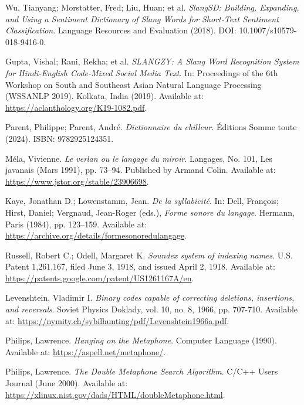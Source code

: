 \documentclass[12pt]{article}
\begin{document}
\begin{thebibliography}{9}
Wu, Tianyang; Morstatter, Fred; Liu, Huan; et al.  
\textit{SlangSD: Building, Expanding, and Using a Sentiment Dictionary of Slang Words for Short-Text Sentiment Classification}.  
Language Resources and Evaluation (2018).  
DOI: 10.1007/s10579-018-9416-0.  

Gupta, Vishal; Rani, Rekha; et al.  
\textit{SLANGZY: A Slang Word Recognition System for Hindi-English Code-Mixed Social Media Text}.  
In: Proceedings of the 6th Workshop on South and Southeast Asian Natural Language Processing (WSSANLP 2019).  
Kolkata, India (2019).  
Available at: \url{https://aclanthology.org/K19-1082.pdf}.

Parent, Philippe; Parent, André.  
\textit{Dictionnaire du chilleur}.  
Éditions Somme toute (2024).  
ISBN: 9782925124351.  

Méla, Vivienne.  
\textit{Le verlan ou le langage du miroir}.  
Langages, No. 101, Les javanais (Mars 1991), pp. 73–94.  
Published by Armand Colin.  
Available at: \url{https://www.jstor.org/stable/23906698}.

Kaye, Jonathan D.; Lowenstamm, Jean.  
\textit{De la syllabicité}.  
In: Dell, François; Hirst, Daniel; Vergnaud, Jean-Roger (eds.), \textit{Forme sonore du langage}.  
Hermann, Paris (1984), pp. 123–159.  
Available at: \url{https://archive.org/details/formesonoredulangage}.

Russell, Robert C.; Odell, Margaret K.  
\textit{Soundex system of indexing names}.  
U.S. Patent 1,261,167, filed June 3, 1918, and issued April 2, 1918.  
Available at: \url{https://patents.google.com/patent/US1261167A/en}.

Levenshtein, Vladimir I.  
\textit{Binary codes capable of correcting deletions, insertions, and reversals}.  
Soviet Physics Doklady, vol. 10, no. 8, 1966, pp. 707-710.  
Available at: \url{https://nymity.ch/sybilhunting/pdf/Levenshtein1966a.pdf}.

Philips, Lawrence.
\textit{Hanging on the Metaphone}.
Computer Language (1990).
Available at: \url{https://aspell.net/metaphone/}.

Philips, Lawrence.
\textit{The Double Metaphone Search Algorithm}.
C/C++ Users Journal (June 2000).
Available at: \url{https://xlinux.nist.gov/dads/HTML/doubleMetaphone.html}.


\end{thebibliography}
\end{document}
